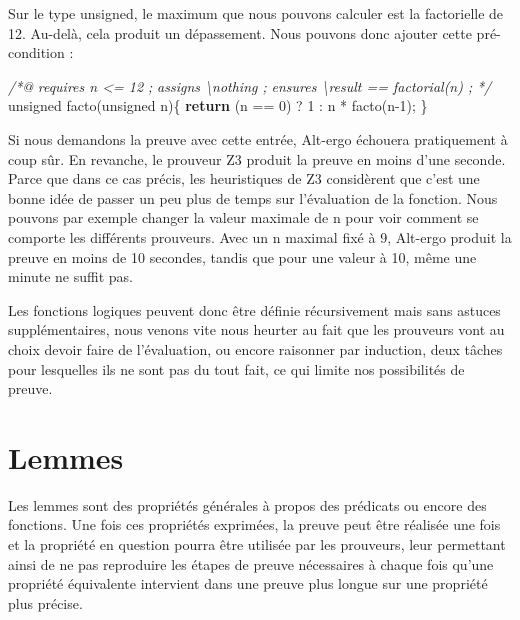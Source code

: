 \documentclass[12pt,francais,]{scrbook}
\newenvironment{Shaded}{}{}
\newcommand{\KeywordTok}[1]{\textcolor[rgb]{0.00,0.44,0.13}{\textbf{{#1}}}}
\newcommand{\DataTypeTok}[1]{\textcolor[rgb]{0.56,0.13,0.00}{{#1}}}
\newcommand{\DecValTok}[1]{\textcolor[rgb]{0.25,0.63,0.44}{{#1}}}
\newcommand{\CommentTok}[1]{\textcolor[rgb]{0.38,0.63,0.69}{\textit{{#1}}}}
\newcommand{\NormalTok}[1]{{#1}}
\begin{document}
Sur le type unsigned, le maximum que nous pouvons calculer est la
factorielle de 12. Au-delà, cela produit un dépassement. Nous pouvons
donc ajouter cette pré-condition :

\begin{footnotesize}\begin{Shaded}
\begin{Highlighting}[]
\CommentTok{/*@ }
\CommentTok{  requires n <= 12 ;}
\CommentTok{  assigns \textbackslash{}nothing ;}
\CommentTok{  ensures \textbackslash{}result == factorial(n) ; }
\CommentTok{*/}
\DataTypeTok{unsigned} \NormalTok{facto(}\DataTypeTok{unsigned} \NormalTok{n)\{}
  \KeywordTok{return} \NormalTok{(n == }\DecValTok{0}\NormalTok{) ? }\DecValTok{1} \NormalTok{: n * facto(n}\DecValTok{-1}\NormalTok{);}
\NormalTok{\}}
\end{Highlighting}
\end{Shaded}\end{footnotesize}

Si nous demandons la preuve avec cette entrée, Alt-ergo échouera
pratiquement à coup sûr. En revanche, le prouveur Z3 produit la preuve
en moins d'une seconde. Parce que dans ce cas précis, les heuristiques
de Z3 considèrent que c'est une bonne idée de passer un peu plus de
temps sur l'évaluation de la fonction. Nous pouvons par exemple changer
la valeur maximale de \og{}n\fg{} pour voir comment se comporte les différents
prouveurs. Avec un \og{}n\fg{} maximal fixé à 9, Alt-ergo produit la preuve en
moins de 10 secondes, tandis que pour une valeur à 10, même une minute
ne suffit pas.

Les fonctions logiques peuvent donc être définie récursivement mais sans
astuces supplémentaires, nous venons vite nous heurter au fait que les
prouveurs vont au choix devoir faire de l'évaluation, ou encore
\og{}raisonner\fg{} par induction, deux tâches pour lesquelles ils ne sont pas
du tout fait, ce qui limite nos possibilités de preuve.

\section{Lemmes}\label{lemmes}

Les lemmes sont des propriétés générales à propos des prédicats ou
encore des fonctions. Une fois ces propriétés exprimées, la preuve peut
être réalisée une fois et la propriété en question pourra être utilisée
par les prouveurs, leur permettant ainsi de ne pas reproduire les étapes
de preuve nécessaires à chaque fois qu'une propriété équivalente
intervient dans une preuve plus longue sur une propriété plus précise.
\end{document}
